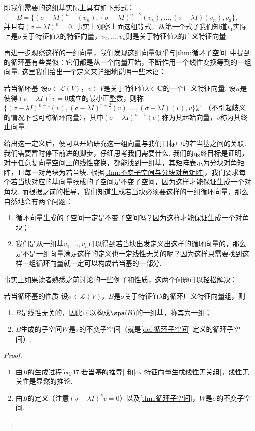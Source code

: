 即我们需要的这组基实际上具有如下形式：
\[B=\{(\sigma-\lambda I)^{n-1}(v_n),(\sigma-\lambda I)^{n-2}(v_n),\ldots,(\sigma-\lambda I)(v_n),v_n\},\]
并且有$(\sigma-\lambda I)^n=0$. 事实上观察上面这组等式，从第一个式子我们知道$v_1$实际上是$\sigma$关于特征值$\lambda$的特征向量，$v_2,\ldots,v_n$则是关于特征值$\lambda$的广义特征向量.

再进一步观察这样的一组向量，我们发现这组向量似乎与\autoref{thm:循环子空间} 中提到的循环基有些类似：它们都是从一个向量开始，不断作用一个线性变换等到的一组向量. 这里我们给出一个定义来详细地说明一些术语：
\begin{definition}{}{若当循环基}
    设$\sigma\in\mathcal{L}(V)$，$v\in V$是关于特征值$\lambda\in\mathbf{C}$的一个广义特征向量. 设$n$是使得$(\sigma-\lambda I)^n v=0$成立的最小正整数，则称$\{(\sigma-\lambda I)^{n-1}(v),(\sigma-\lambda I)^{n-2}(v),\ldots,(\sigma-\lambda I)(v),v\}$是 （不引起歧义的情况下也可称循环向量），其中$(\sigma-\lambda I)^{n-1}(v)$称为其起始向量，$v$称为其终止向量.
\end{definition}

给出这一定义后，便可以开始研究这一组向量与我们目标中的若当基之间的关联. 我们需要暂时停下前进的脚步，仔细思考我们需要什么. 我们的最终目标是证明，对于任意复向量空间上的线性变换，都能找到一组基，其矩阵表示为分块对角矩阵，且每一对角块为若当块. 根据\autoref{thm:不变子空间与分块对角矩阵}，我们要求每个若当块对应的基向量张成的子空间是不变子空间，因为这样才能保证生成一个对角块. 而根据之前的推导，我们知道生成若当块必须要这样的一组循环向量，那么自然地会有两个问题：
\begin{enumerate}
    \item 循环向量生成的子空间一定是不变子空间吗？因为这样才能保证生成一个对角块；
    \item 我们是从一组基$v_1,\ldots,v_n$可以得到若当块出发定义出这样的循环向量的，那么是不是一组向量满足这样的定义也一定线性无关的呢？因为这样只需要找到这样一组循环向量就一定可以构成若当基的一部分.
\end{enumerate}
事实上如果读者熟悉之前讨论的一些例子和性质，这两个问题可以轻松解决：
\begin{theorem}{}{若当循环基的性质}
    设$\sigma\in\mathcal{L}(V)$，$B$是$\sigma$关于特征值$\lambda$的循环广义特征向量组，则
    \begin{enumerate}
        \item $B$是线性无关的，因此可以构成$\spa(B)$的一组基，称其为一组；
        \item $B$生成的子空间$W$是$\sigma$的不变子空间（就是\autoref{def:循环子空间} 定义的循环子空间）.
    \end{enumerate}
\end{theorem}
\begin{proof}
    \begin{enumerate}
        \item 由$B$的生成过程\autoref{eq:17:若当基的推导} 和\autoref{ex:特征向量生成线性无关组}，线性无关性是显然的推论.
        \item 由$B$的定义（注意$(\sigma-\lambda I)^n v=0$）以及\autoref{thm:循环子空间}，$W$是$\sigma$的不变子空间.
    \end{enumerate}
\end{proof}

